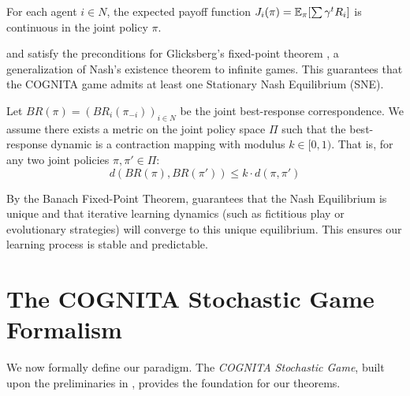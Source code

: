 \begin{assumption}
\label{assump:continuity}
For each agent $i \in N$, the expected payoff function $J_i(\pi) = \mathbb{E}_{\pi}[\sum \gamma^t R_i]$ is continuous in the joint policy $\pi$.
\end{assumption}

\begin{remark}
 and  satisfy the preconditions for Glicksberg's fixed-point theorem \citep{glicksberg1952further}, a generalization of Nash's existence theorem to infinite games. This guarantees that the COGNITA game admits at least one Stationary Nash Equilibrium (SNE).
\end{remark}

\begin{assumption}
\label{assump:contraction}
Let $BR(\pi) = (BR_i(\pi_{-i}))_{i \in N}$ be the joint best-response correspondence. We assume there exists a metric on the joint policy space $\Pi$ such that the best-response dynamic is a contraction mapping with modulus $k \in [0, 1)$. That is, for any two joint policies $\pi, \pi' \in \Pi$:
\[
d(BR(\pi), BR(\pi')) \le k \cdot d(\pi, \pi')
\]
\end{assumption}

\begin{remark}
By the Banach Fixed-Point Theorem,  guarantees that the Nash Equilibrium is unique and that iterative learning dynamics (such as fictitious play or evolutionary strategies) will converge to this unique equilibrium. This ensures our learning process is stable and predictable.
\end{remark}

\section{The COGNITA Stochastic Game Formalism}

We now formally define our paradigm. The \emph{COGNITA Stochastic Game}, built upon the preliminaries in , provides the foundation for our theorems.

